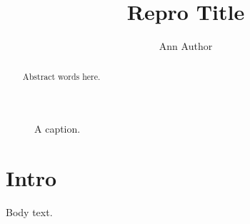 \documentclass{article}
\title{Repro Title}\author{Ann Author}\date{}
\begin{document}
\maketitle
\begin{figure}[h]\centering{}\caption{A caption.}\end{figure}
\begin{abstract}Abstract words here.\end{abstract}
\section{Intro}Body text.
\end{document}
